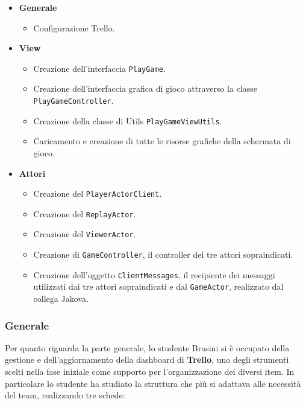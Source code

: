         \begin{itemize}
        \item \textbf{Generale}
        		\begin {itemize}
		\item Configurazione Trello.
     	\end {itemize}

     	\item \textbf{View}
		\begin {itemize}
		\item Creazione dell'interfaccia \texttt{PlayGame}.
		\item Creazione dell'interfaccia grafica di gioco attraverso la classe \texttt{PlayGameController}.
		\item Creazione della classe di Utils \texttt{PlayGameViewUtils}.
		\item Caricamento e creazione di tutte le risorse grafiche della schermata di gioco.
	\end {itemize}

	\item \textbf{Attori}
		\begin {itemize}
		\item Creazione del \texttt{PlayerActorClient}.
		\item Creazione del \texttt{ReplayActor}.
		\item Creazione del \texttt{ViewerActor}.
		\item Creazione di \texttt{GameController}, il controller dei tre attori sopraindicati.
		\item Creazione dell'oggetto \texttt{ClientMessages}, il recipiente dei messaggi utilizzati dai tre attori sopraindicati e dal \texttt{GameActor}, realizzato dal collega Jakova.
		\end{itemize}

     \end {itemize}

     \clearpage

     \subsubsection{Generale}\label{subsub:brasini:general}
     Per quanto riguarda la parte generale, lo studente Brasini si è occupato della gestione e dell'aggiornamento della dashboard di \textbf{Trello}, uno degli strumenti scelti nella fase iniziale come supporto per l'organizzazione dei diversi item. In particolare lo studente ha studiato la struttura che più si adattava alle necessità del team, realizzando tre schede:

